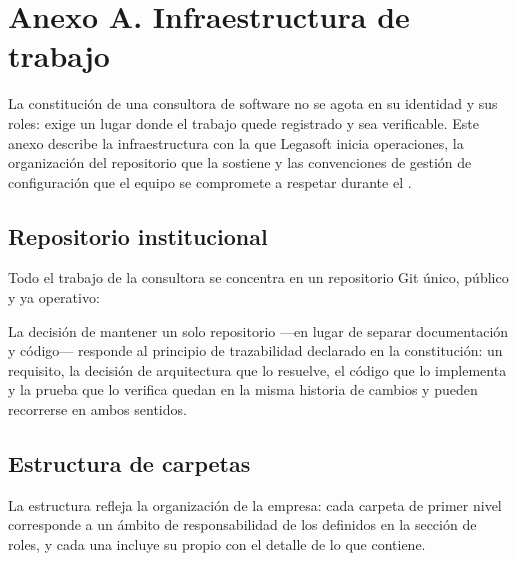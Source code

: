 
\section{Anexo A. Infraestructura de trabajo}

La constitución de una consultora de software no se agota en su identidad y sus
roles: exige un lugar donde el trabajo quede registrado y sea verificable. Este
anexo describe la infraestructura con la que Legasoft inicia operaciones, la
organización del repositorio que la sostiene y las convenciones de gestión de
configuración que el equipo se compromete a respetar durante el \lgSemestre.

\subsection{Repositorio institucional}

Todo el trabajo de la consultora se concentra en un repositorio Git único,
público y ya operativo:

\begin{nota}
\href{\lgRepo}{\lgRepoCorto}
\end{nota}

La decisión de mantener un solo repositorio —en lugar de separar documentación y
código— responde al principio de trazabilidad declarado en la constitución: un
requisito, la decisión de arquitectura que lo resuelve, el código que lo
implementa y la prueba que lo verifica quedan en la misma historia de cambios y
pueden recorrerse en ambos sentidos.

\subsection{Estructura de carpetas}

La estructura refleja la organización de la empresa: cada carpeta de primer nivel
corresponde a un ámbito de responsabilidad de los definidos en la sección de
roles, y cada una incluye su propio  con el detalle de lo que
contiene.

